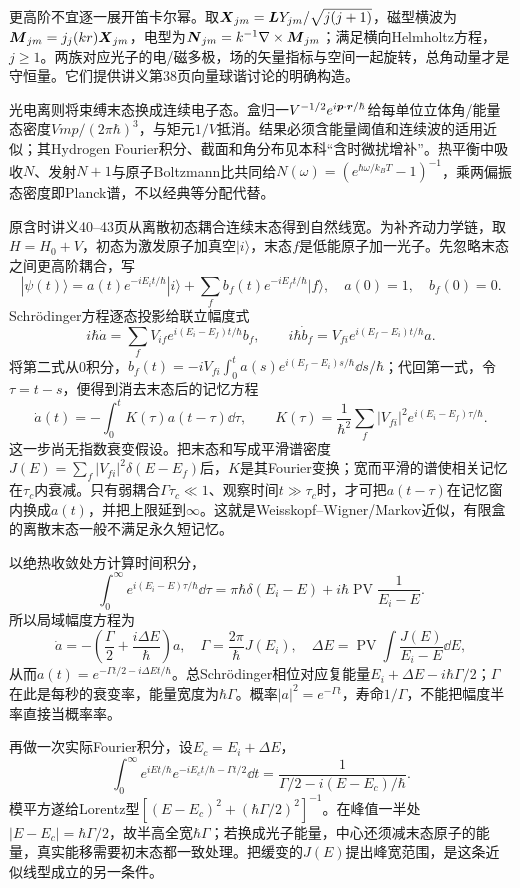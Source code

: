 更高阶不宜逐一展开笛卡尔幂。取$\boldsymbol{X}_{jm}=\boldsymbol{L} Y_{jm}/\sqrt{j(j+1)}$，磁型横波为$\boldsymbol{M}_{jm}=j_j(kr)\boldsymbol{X}_{jm}$，电型为$\boldsymbol{N}_{jm}=k^{-1}\nabla\times\boldsymbol{M}_{jm}$；满足横向Helmholtz方程，$j\ge1$。两族对应光子的电/磁多极，场的矢量指标与空间一起旋转，总角动量才是守恒量。它们提供讲义第38页向量球谐讨论的明确构造。

光电离则将束缚末态换成连续电子态。盒归一$V^{-1/2}e^{i\boldsymbol{p}\cdot\boldsymbol{r}/\hbar}$给每单位立体角/能量态密度$Vm p/(2\pi\hbar)^3$，与矩元$1/V$抵消。结果必须含能量阈值和连续波的适用近似；其Hydrogen Fourier积分、截面和角分布见本科“含时微扰增补”。热平衡中吸收$N$、发射$N+1$与原子Boltzmann比共同给$N(\omega)=(e^{\hbar\omega/k_BT}-1)^{-1}$，乘两偏振态密度即Planck谱，不以经典等分配代替。

原含时讲义40--43页从离散初态耦合连续末态得到自然线宽。为补齐动力学链，取$H=H_0+V$，初态为激发原子加真空$|i\rangle$，末态$f$是低能原子加一光子。先忽略末态之间更高阶耦合，写
\[
 |\psi(t)\rangle=a(t)e^{-iE_it/\hbar}|i\rangle+
 \sum_f b_f(t)e^{-iE_ft/\hbar}|f\rangle,\quad a(0)=1,\quad b_f(0)=0.
\]
Schrödinger方程逐态投影给联立幅度式
\[
 i\hbar\dot a=\sum_fV_{if}e^{i(E_i-E_f)t/\hbar}b_f,\qquad
 i\hbar\dot b_f=V_{fi}e^{i(E_f-E_i)t/\hbar}a.
\]
将第二式从0积分，$b_f(t)=-iV_{fi}\int_0^t a(s)e^{i(E_f-E_i)s/\hbar}\dd s/\hbar$；代回第一式，令$\tau=t-s$，便得到消去末态后的记忆方程
\[
 \dot a(t)=-\int_0^t K(\tau)a(t-\tau)\dd\tau,\qquad
 K(\tau)=\frac1{\hbar^2}\sum_f|V_{fi}|^2e^{i(E_i-E_f)\tau/\hbar}.
\]
这一步尚无指数衰变假设。把末态和写成平滑谱密度$J(E)=\sum_f|V_{fi}|^2\delta(E-E_f)$后，$K$是其Fourier变换；宽而平滑的谱使相关记忆在$\tau_c$内衰减。只有弱耦合$\Gamma\tau_c\ll1$、观察时间$t\gg\tau_c$时，才可把$a(t-\tau)$在记忆窗内换成$a(t)$，并把上限延到$\infty$。这就是Weisskopf--Wigner/Markov近似，有限盒的离散末态一般不满足永久短记忆。

以绝热收敛处方计算时间积分，
\[
 \int_0^\infty e^{i(E_i-E)\tau/\hbar}\dd\tau
 =\pi\hbar\delta(E_i-E)+i\hbar\operatorname{PV}\frac1{E_i-E}.
\]
所以局域幅度方程为
\[
 \dot a=-\left(\frac\Gamma2+\frac{i\Delta E}\hbar\right)a,\quad
 \Gamma=\frac{2\pi}{\hbar}J(E_i),\quad
 \Delta E=\operatorname{PV}\int\frac{J(E)}{E_i-E}\dd E,
\]
从而$a(t)=e^{-\Gamma t/2-i\Delta Et/\hbar}$。总Schrödinger相位对应复能量$E_i+\Delta E-i\hbar\Gamma/2$；$\Gamma$在此是每秒的衰变率，能量宽度为$\hbar\Gamma$。概率$|a|^2=e^{-\Gamma t}$，寿命$1/\Gamma$，不能把幅度半率直接当概率率。

再做一次实际Fourier积分，设$E_c=E_i+\Delta E$，
\[
 \int_0^\infty e^{iEt/\hbar}e^{-iE_ct/\hbar-\Gamma t/2}\dd t
 =\frac1{\Gamma/2-i(E-E_c)/\hbar}.
\]
模平方遂给Lorentz型$[(E-E_c)^2+(\hbar\Gamma/2)^2]^{-1}$。在峰值一半处$|E-E_c|=\hbar\Gamma/2$，故半高全宽$\hbar\Gamma$；若换成光子能量，中心还须减末态原子的能量，真实能移需要初末态都一致处理。把缓变的$J(E)$提出峰宽范围，是这条近似线型成立的另一条件。

